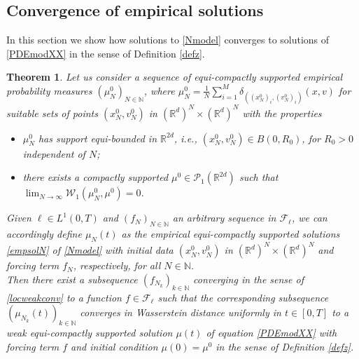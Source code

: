 \documentclass[11pt]{article}
\theoremstyle{plain}
\newtheorem{theorem}{Theorem}[section]
\theoremstyle{definition}
\theoremstyle{remark}
\numberwithin{equation}{section}
\begin{document}
\subsection{Convergence of empirical solutions}
In this section we show how solutions to \eqref{Nmodel} converges to solutions of \eqref{PDEmodXX} in the sense of Definition \ref{defz}.
\begin{theorem}\label{thm:5}
Let us consider a sequence of equi-compactly supported empirical probability measures $(\mu_N^0)_{N \in \mathbb N}$, where $\mu_N^0 = \frac{1}{N} \sum_{i=1}^M \delta_{((x_N^0)_i,(v_N^0)_i)}(x,v) $ for suitable sets of points $(x^0_N,v_N^0)$ in $(\mathbb R^d)^N \times (\mathbb R^d)^N$ with the properties
\begin{itemize}
\item[(i)] $\mu_N^0$ has support equi-bounded in $\mathbb R^{2d}$, i.e., $(x^0_N,v_N^0)\in B(0,R_0)$, for $R_0>0$ independent of $N$;
\item[(ii)] there exists a compactly supported $\mu^0 \in \mathcal P_1(\mathbb R^{2d})$ such that $\lim_{N \to \infty} \mathcal W_1(\mu_N^0,\mu^0)=0$.
\end{itemize}
Given $\ell \in L^1(0,T)$ and $(f_N)_{N \in \mathbb N}$ an arbitrary sequence in $\mathcal F_\ell$, we can accordingly define $\mu_N(t)$ as the empirical equi-compactly supported solutions \eqref{empsolN} of \eqref{Nmodel} with initial data $(x^0_N,v_N^0)$ in $(\mathbb R^d)^N \times (\mathbb R^d)^N$ and forcing term $f_N$, respectively, for all $N \in \mathbb N$. \\
Then there exist a subsequence $(f_{N_k})_{k \in \mathbb N}$ converging in the sense of \eqref{locweakconv} to a function $f \in \mathcal F_\ell$ such that the corresponding subsequence $(\mu_{N_k}(t))_{k \in \mathbb N}$ converges in Wasserstein distance uniformly in $t \in [0,T]$  to a weak equi-compactly supported solution $\mu(t)$ of equation \eqref{PDEmodXX} with forcing term $f$ and initial condition
$\mu(0) = \mu^0$  in the sense of Definition \ref{defz}.
\end{theorem}
\end{document}
